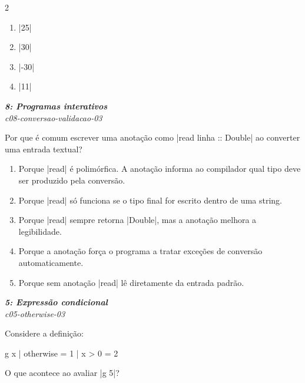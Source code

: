\documentclass[a4paper,10pt,brazil]{article}
\begin{document}
\begin{multicols}{2}
\begin{enumerate}
  \item \haskellinline|25|

  \item \haskellinline|30|

  \item \haskellinline|-30|

  \item \haskellinline|11|


\end{enumerate}

\begin{flushright}
  \footnotesize
  \textit{\textbf{8: Programas interativos}}\\
  \textit{c08-conversao-validacao-03}\\

\end{flushright}
Por que é comum escrever uma anotação como \haskellinline|read linha :: Double| ao converter uma entrada textual?

\begin{enumerate}
  \item Porque \haskellinline|read| é polimórfica. A anotação informa ao compilador qual tipo deve ser produzido pela conversão.

  \item Porque \haskellinline|read| só funciona se o tipo final for escrito dentro de uma string.

  \item Porque \haskellinline|read| sempre retorna \haskellinline|Double|, mas a anotação melhora a legibilidade.

  \item Porque a anotação força o programa a tratar exceções de conversão automaticamente.

  \item Porque sem anotação \haskellinline|read| lê diretamente da entrada padrão.


\end{enumerate}

\begin{flushright}
  \footnotesize
  \textit{\textbf{5: Expressão condicional}}\\
  \textit{c05-otherwise-03}\\

\end{flushright}
Considere a definição:
\begin{haskellcode}
g x
  | otherwise = 1
  | x > 0     = 2
\end{haskellcode}
O que acontece ao avaliar \haskellinline|g 5|?


\end{multicols}
\end{document}
